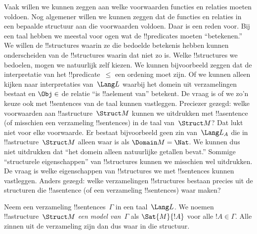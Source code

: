 \documentclass[../../../include/open-logic-section]{subfiles}
\begin{document}


\begin{explain}
Vaak willen we kunnen zeggen aan welke voorwaarden functies en
relaties moeten voldoen. Nog algemener willen we kunnen zeggen dat de
functies en relaties in een bepaalde structuur aan die voorwaarden
voldoen. Daar is een reden voor. Bij een taal hebben we meestal voor
ogen wat de !!{predicate}s moeten ``betekenen.'' We willen de
!!{structure}s waarin ze die bedoelde betekenis hebben kunnen
onderscheiden van de !!{structure}s waarin dat niet zo is.
Welke !!{structure}s we bedoelen, mogen we natuurlijk zelf kiezen. We
kunnen bijvoorbeeld zeggen dat de interpretatie van het
!!{predicate}~$\le$ een ordening moet zijn. Of we kunnen alleen kijken
naar interpretaties van~$\Lang L$ waarbij het domein uit verzamelingen
bestaat en $\Obj \in$ de relatie ``is !!a{element} van'' betekent. De
vraag is of we zo'n keuze ook met !!{sentence}s van de taal kunnen
vastleggen. Preciezer gezegd: welke voorwaarden aan
!!a{structure}~$\Struct M$ kunnen we uitdrukken met !!a{sentence} (of
misschien een verzameling !!{sentence}s) in de taal van~$\Struct M$?
Dat lukt niet voor elke voorwaarde. Er bestaat bijvoorbeeld geen zin
van~$\Lang L_A$ die in !!a{structure}~$\Struct M$ alleen waar is als
$\Domain M = \Nat$. We kunnen dus niet uitdrukken dat ``het domein
alleen natuurlijke getallen bevat.'' Sommige ``structurele
eigenschappen'' van !!{structure}s kunnen we misschien wel
uitdrukken. De vraag is welke eigenschappen van !!{structure}s we met
!!{sentence}s kunnen vastleggen. Anders gezegd: welke verzamelingen
!!{structure}s bestaan precies uit de structuren die !!a{sentence} (of
een verzameling !!{sentence}s) waar maken?
\end{explain}

\begin{defn}
Neem een verzameling !!{sentence}s~$\Gamma$ in een taal~$\Lang L$. We
noemen !!a{structure}~$\Struct M$ \emph{een model van}~$\Gamma$ als
$\Sat{M}{!A}$ voor alle $!A \in \Gamma$. Alle zinnen uit de verzameling
zijn dan dus waar in die structuur.
\end{defn}
\end{document}
